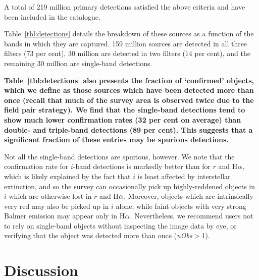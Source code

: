\documentclass[a4paper,useAMS,usenatbib]{mn2e}
\def\ha{\mbox{H$\rm \alpha$}}
\begin{document}
A total of 219 million primary detections satisfied
the above criteria and have been included in the catalogue.

Table~\ref{tbl:detections} details the breakdown of these
sources as a function of the bands in which they are captured.
159 million sources are detected in all three filters (73 per cent),
30 million are detected in two filters (14 per cent),
and the remaining 30 million are single-band detections.
{\bf
Table~\ref{tbl:detections} also presents 
the fraction of `confirmed' objects,
which we define as those sources
which have been detected more than once
(recall that much of the survey area
is observed twice due to the field pair strategy).
We find that the single-band detections tend
to show much lower confirmation rates (32 per cent on average)
than double- and triple-band detections (89 per cent).
This suggests that a significant fraction of
these entries may be spurious detections.

Not all the single-band detections are spurious, however.
We note that the confirmation rate for $i$-band detections
is markedly better than for $r$ and \ha,
which is likely explained by the fact that $i$ is least
affected by interstellar extinction, and so the survey can occasionally pick up
highly-reddened objects in $i$ which are otherwise lost in $r$ and \ha.
Moreover, objects which are intrinsically very red may also be picked
up in $i$ alone, while faint objects with very strong Balmer emission
may appear only in \ha.
Nevertheless, we recommend users not to rely on single-band objects
without inspecting the image data by eye,
or verifying that the object
was detected more than once (\emph{nObs}$>$1).
}

\section{Discussion}
\label{sec:discussion}
\end{document}
